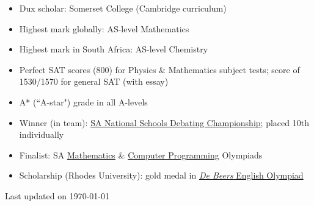 \documentclass[10pt,a4paper,ragged2e,academicons]{altacv}
\newcommand{\updateinfo}[1][\today]{\par\vfill\hfill{\scriptsize\color{BodyColor}Last updated on #1}}
\begin{document}
\begin{itemize}
    \item Dux scholar: Somerset College (Cambridge curriculum)
    \item Highest mark globally: AS-level Mathematics
    \item Highest mark in South Africa: AS-level Chemistry
    \item Perfect SAT scores (800) for Physics \& Mathematics subject tests; score of 1530/1570 for general SAT (with essay)
    \item A* (``A-star") grade in all A-levels
    \item Winner (in team): \href{https://sadebating.org/phalaborwa-2016/}{SA National Schools Debating Championship}; placed 10th individually
    \item Finalist: SA \href{https://www.samf.ac.za/en/sa-mathematics-olympiad}{Mathematics} \& \href{https://olympiad.org.za/programming-olympiad/}{Computer Programming} Olympiads
    \item Scholarship (Rhodes University): gold medal in \href{https://sacee.org.za/projects/english-olympiad/}{\emph{De Beers} English Olympiad}
\end{itemize}
    

\updateinfo












\end{document}
